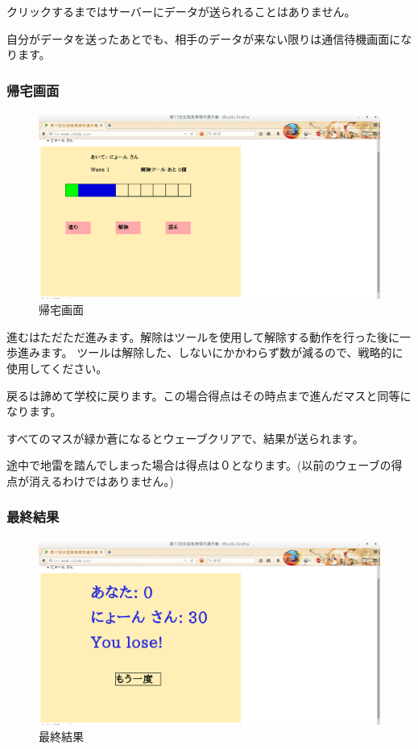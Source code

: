 クリックするまではサーバーにデータが送られることはありません。

自分がデータを送ったあとでも、相手のデータが来ない限りは通信待機画面になります。

\subsubsection{帰宅画面}\label{ux5e30ux5b85ux753bux9762}

\begin{figure}[htbp]
\centering
\includegraphics{./do.png}
\caption{帰宅画面}
\end{figure}

進むはただただ進みます。解除はツールを使用して解除する動作を行った後に一歩進みます。
ツールは解除した、しないにかかわらず数が減るので、戦略的に使用してください。

戻るは諦めて学校に戻ります。この場合得点はその時点まで進んだマスと同等になります。

すべてのマスが緑か蒼になるとウェーブクリアで、結果が送られます。

途中で地雷を踏んでしまった場合は得点は０となります。(以前のウェーブの得点が消えるわけではありません。)

\subsubsection{最終結果}\label{ux6700ux7d42ux7d50ux679c}

\begin{figure}[htbp]
\centering
\includegraphics{./result.png}
\caption{最終結果}
\end{figure}

